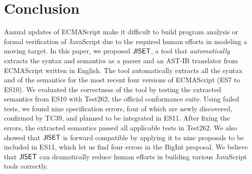 \section{Conclusion}\label{sec:conclude}
Annual updates of ECMAScript make it difficult to build program
analysis or formal verification of JavaScript due to the required human efforts
in modeling a moving target.  In this paper, we proposed \( \text{\sf JISET} \), a tool
that \textit{automatically} extracts the syntax and semantics as a parser and
an AST-IR translator from ECMAScript written in English.
The tool automatically extracts all the syntax and  of the
semantics for the most recent four versions of ECMAScript (ES7 to ES10).
We evaluated the correctness of the tool by testing the extracted
semantics from ES10 with Test262, the official conformance suite.
Using  failed tests, we found nine specification errors,
four of which are newly discovered, confirmed by TC39, and planned to
be integrated in ES11.  After fixing the errors, the extracted
semantics passed all  applicable tests in Test262.
We also showed that \( \text{\sf JISET} \) is forward compatible by applying it to nine
proposals to be included in ES11, which let us find four errors in the
BigInt proposal.  We believe that \( \text{\sf JISET} \) can dramatically reduce
human efforts in building various JavaScript tools correctly.